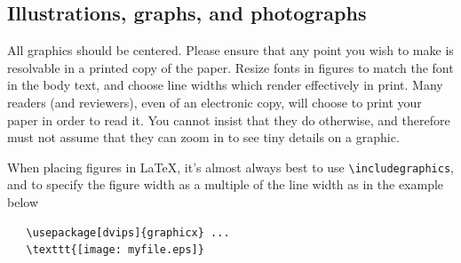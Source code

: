\documentclass[10pt,twocolumn,letterpaper]{article}
\begin{document}
\subsection{Illustrations, graphs, and photographs}

All graphics should be centered.  Please ensure that any point you wish to make is resolvable in a printed copy of the paper.  Resize fonts in figures to match the font in the body text, and choose line widths which render effectively in print.  Many readers (and reviewers), even of an electronic copy, will choose to print your paper in order to read it.  You cannot
insist that they do otherwise, and therefore must not assume that they can
zoom in to see tiny details on a graphic.

When placing figures in \LaTeX, it's almost always best to use
\verb+\includegraphics+, and to specify the  figure width as a multiple of
the line width as in the example below
{\small\begin{verbatim}
   \usepackage[dvips]{graphicx} ...
   \texttt{[image: myfile.eps]}
\end{verbatim}
}

%
%
\end{document}
